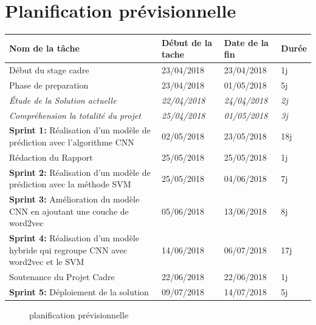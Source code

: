 \section{Planification prévisionnelle}
\begin{tabular}{|p{6cm}|p{3cm}|p{3cm}|p{2cm}|}
\hline
\textbf{Nom de la tâche} & \textbf{Début de la tache} & \textbf{Date de la fin} & \textbf{Durée} \\
\hline
 Début du stage cadre & 23/04/2018 & 23/04/2018 & 1j\\
\hline
 Phase de preparation & 23/04/2018 & 01/05/2018 & 5j\\
\hline 
\textit{\hspace{1cm}Étude de la Solution actuelle} & \textit{22/04/2018} &  \textit{24/04/2018} & \textit{2j}\\
\hline
\textit{\hspace{1cm}Compréhension la totalité du projet} & \textit{25/04/2018} & \textit{01/05/2018} &  \textit{3j}\\
\hline
\textbf{Sprint 1: }Réalisation d'un modèle de prédiction avec l'algorithme CNN & 02/05/2018 & 23/05/2018 & 18j\\
\hline
Rédaction du Rapport & 25/05/2018 & 25/05/2018 & 1j \\
\hline
\textbf{Sprint 2: }Réalisation d'un modèle de prédiction avec la méthode SVM & 25/05/2018 & 04/06/2018 & 7j\\
\hline
\textbf{Sprint 3: }Amélioration du modèle CNN en ajoutant une couche de word2vec & 05/06/2018 & 13/06/2018 & 8j\\

\hline 
\textbf{Sprint 4: }Réalisation d'un modèle hybride qui regroupe CNN avec word2vec et le SVM & 14/06/2018 & 06/07/2018 & 17j\\
\hline
Soutenance du Projet Cadre & 22/06/2018 & 22/06/2018 & 1j\\
\hline
\textbf{Sprint 5: }Déploiement de la solution & 09/07/2018 & 14/07/2018 & 5j\\
\hline
\end{tabular}
\begin{figure}[h]
  \caption{planification prévisionnelle}
  \label{fig:planification}
\end{figure}
